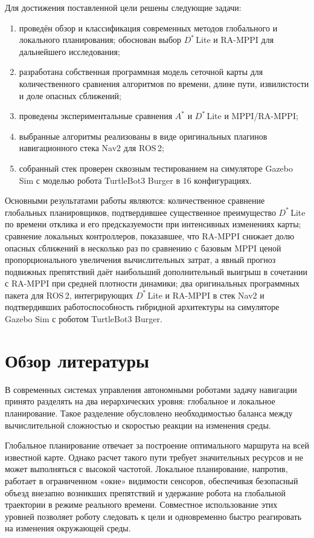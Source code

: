 \documentclass[a4paper,12pt]{extarticle}
\begin{document}
Для достижения поставленной цели решены следующие задачи:

\begin{enumerate}
    \item проведён обзор и классификация современных методов глобального и локального планирования; обоснован выбор $D^*$\,Lite и RA-MPPI для дальнейшего исследования;
    \item разработана собственная программная модель сеточной карты для количественного сравнения алгоритмов по времени, длине пути, извилистости и доле опасных сближений;
    \item проведены экспериментальные сравнения $A^*$ и $D^*$\,Lite и MPPI/RA-MPPI;
    \item выбранные алгоритмы реализованы в виде оригинальных плагинов навигационного стека Nav2 для ROS\,2;
    \item собранный стек проверен сквозным тестированием на симуляторе Gazebo Sim с моделью робота TurtleBot3 Burger в $16$ конфигурациях.
\end{enumerate}

Основными результатами работы являются: количественное сравнение глобальных планировщиков, подтвердившее существенное преимущество $D^*$\,Lite по времени отклика и его предсказуемости при интенсивных изменениях карты; сравнение локальных контроллеров, показавшее, что RA-MPPI снижает долю опасных сближений в несколько раз по сравнению с базовым MPPI ценой пропорционального увеличения вычислительных затрат, а явный прогноз подвижных препятствий даёт наибольший дополнительный выигрыш в сочетании с RA-MPPI при средней плотности динамики; два оригинальных программных пакета для ROS\,2, интегрирующих $D^*$\,Lite и RA-MPPI в стек Nav2 и подтвердивших работоспособность гибридной архитектуры на симуляторе Gazebo Sim с роботом TurtleBot3 Burger.
    \pagebreak

    \section{Обзор литературы}\label{sec:review}
    В современных системах управления автономными роботами задачу навигации принято разделять на
    два иерархических уровня: глобальное и локальное планирование.
    Такое разделение обусловлено необходимостью баланса между вычислительной сложностью и
    скоростью реакции на изменения среды.

    Глобальное планирование отвечает за построение оптимального маршрута на всей известной карте.
    Однако расчет такого пути требует значительных ресурсов и не может выполняться с высокой частотой.
    Локальное планирование, напротив, работает в ограниченном «окне» видимости сенсоров,
    обеспечивая безопасный объезд внезапно возникших препятствий и
    удержание робота на глобальной траектории в режиме реального времени.
    Совместное использование этих уровней позволяет роботу следовать к цели и одновременно
    быстро реагировать на изменения окружающей среды.
\end{document}
